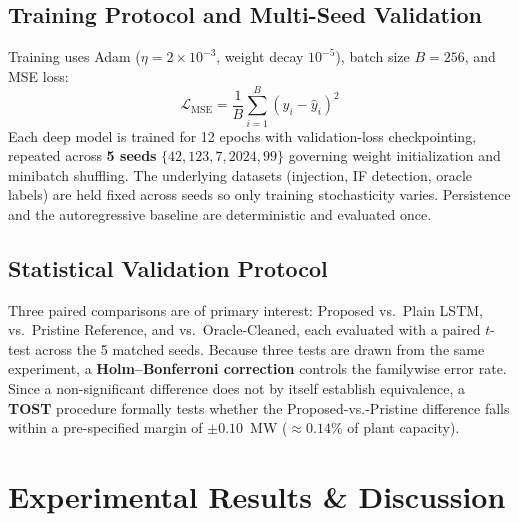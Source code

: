 \documentclass[conference]{IEEEtran}
\begin{document}
\subsection{Training Protocol and Multi-Seed Validation}
Training uses Adam ($\eta = 2\times 10^{-3}$, weight decay $10^{-5}$), batch size $B=256$, and MSE loss:
\begin{equation}
\mathcal{L}_{\text{MSE}} = \frac{1}{B}\sum_{i=1}^{B}\left(y_i - \hat{y}_i\right)^2
\end{equation}
Each deep model is trained for 12 epochs with validation-loss checkpointing, repeated across \textbf{5 seeds} $\{42, 123, 7, 2024, 99\}$ governing weight initialization and minibatch shuffling. The underlying datasets (injection, IF detection, oracle labels) are held fixed across seeds so only training stochasticity varies. Persistence and the autoregressive baseline are deterministic and evaluated once.

\subsection{Statistical Validation Protocol}
\label{sec:stat_protocol}
Three paired comparisons are of primary interest: Proposed vs.\ Plain LSTM, vs.\ Pristine Reference, and vs.\ Oracle-Cleaned, each evaluated with a paired $t$-test across the 5 matched seeds. Because three tests are drawn from the same experiment, a \textbf{Holm--Bonferroni correction} controls the familywise error rate. Since a non-significant difference does not by itself establish equivalence, a \textbf{TOST} procedure formally tests whether the Proposed-vs.-Pristine difference falls within a pre-specified margin of $\pm 0.10$~MW ($\approx 0.14\%$ of plant capacity).

\section{Experimental Results \& Discussion}
\end{document}
